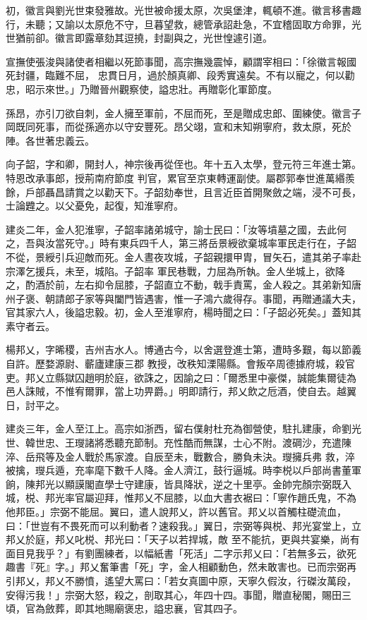\begin{pinyinscope}
 初，徽言與劉光世束發雅故。光世被命援太原，次吳堡津，輒頓不進。徽言移書趣行，未聽；又諭以太原危不守，旦暮望救，總管承詔赴急，不宜稽固取方命罪，光世猶前卻。徽言即露章劾其逗撓，封副與之，光世惶遽引道。



 宣撫使張浚與諸使者相繼以死節事聞，高宗撫幾震悼，顧謂宰相曰：「徐徽言報國死封疆，臨難不屈，
 忠貫日月，過於顏真卿、段秀實遠矣。不有以寵之，何以勸忠，昭示來世。」乃贈晉州觀察使，謚忠壯。再贈彰化軍節度。



 孫昂，亦引刀欲自刺，金人擁至軍前，不屈而死，至是贈成忠郎、圍練使。徽言子岡既同死事，而從孫適亦以守安豐死。昂父翊，宣和末知朔寧府，救太原，死於陣。各世著忠義云。



 向子韶，字和卿，開封人，神宗後再從侄也。年十五入太學，登元符三年進士第。特恩改承事郎，授荊南府節度
 判官，累官至京東轉運副使。屬郡郭奉世進萬緡羨餘，戶部聶昌請賞之以勸天下。子韶劾奉世，且言近臣首開聚斂之端，浸不可長，士論韙之。以父憂免，起復，知淮寧府。



 建炎二年，金人犯淮寧，子韶率諸弟城守，諭士民曰：「汝等墳墓之國，去此何之，吾與汝當死守。」時有東兵四千人，第三將岳景綬欲棄城率軍民走行在，子韶不從，景綬引兵迎敵而死。金人晝夜攻城，子韶親擐甲胄，冒矢石，遣其弟子率赴宗澤乞援兵，未至，城陷。子韶率
 軍民巷戰，力屈為所執。金人坐城上，欲降之，酌酒於前，左右抑令屈膝，子韶直立不動，戟手責罵，金人殺之。其弟新知唐州子褒、朝請郎子家等與闔門皆遇害，惟一子鴻六歲得存。事聞，再贈通議大夫，官其家六人，後謚忠毅。初，金人至淮寧府，楊時聞之曰：「子韶必死矣。」蓋知其素守者云。



 楊邦乂，字晞稷，吉州吉水人。博通古今，以舍選登進士第，遭時多艱，每以節義自許。歷婺源尉、蘄廬建康三郡
 教授，改秩知溧陽縣。會叛卒周德據府城，殺官吏。邦乂立縣獄囚趙明於庭，欲誅之，因諭之曰：「爾悉里中豪傑，誠能集爾徒為邑人誅賊，不惟宥爾罪，當上功畀爵。」明即請行，邦乂飲之卮酒，使自去。越翼日，討平之。



 建炎三年，金人至江上。高宗如浙西，留右僕射杜充為御營使，駐扎建康，命劉光世、韓世忠、王𤫉諸將悉聽充節制。充性酷而無謀，士心不附。渡碙沙，充遣陳淬、岳飛等及金人戰於馬家渡。自辰至未，戰數合，勝負未決。𤫉擁兵弗
 救，淬被擒，𤫉兵遁，充率麾下數千人降。金人濟江，鼓行逼城。時李棁以戶部尚書董軍餉，陳邦光以顯謨閣直學士守建康，皆具降狀，逆之十里亭。金帥完顏宗弼既入城，棁、邦光率官屬迎拜，惟邦乂不屈膝，以血大書衣裾曰：「寧作趙氏鬼，不為他邦臣。」宗弼不能屈。翼曰，遣人說邦乂，許以舊官。邦乂以首觸柱礎流血，曰：「世豈有不畏死而可以利動者？速殺我。」翼日，宗弼等與棁、邦光宴堂上，立邦乂於庭，邦乂叱棁、邦光曰：「天子以若捍城，敵
 至不能抗，更與共宴樂，尚有面目見我乎？」有劉團練者，以幅紙書「死活」二字示邦乂曰：「若無多云，欲死趣書『死』字。」邦乂奮筆書「死」字，金人相顧動色，然未敢害也。已而宗弼再引邦乂，邦乂不勝憤，遙望大罵曰：「若女真圖中原，天寧久假汝，行磔汝萬段，安得污我！」宗弼大怒，殺之，剖取其心，年四十四。事聞，贈直秘閣，賜田三頃，官為斂葬，即其地賜廟褒忠，謚忠襄，官其四子。




\end{pinyinscope}
